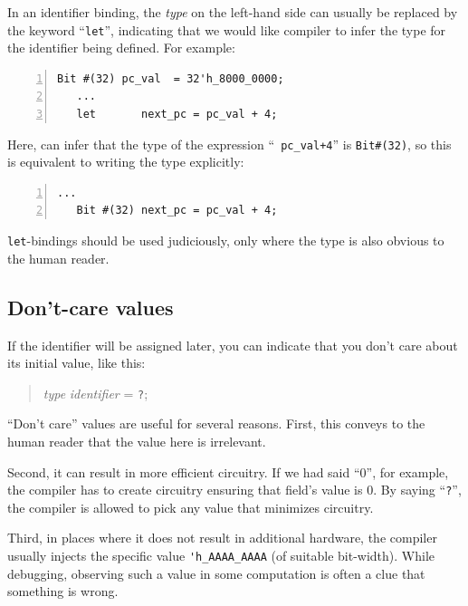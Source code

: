 In an identifier binding, the \emph{type} on the left-hand side can
usually be replaced by the keyword ``{\tt let}'', indicating that we
would like {\bsc} compiler to infer the type for the identifier being
defined.  For example:

{\footnotesize
\begin{Verbatim}[frame=single, numbers=left]
   Bit #(32) pc_val  = 32'h_8000_0000;
   ...
   let       next_pc = pc_val + 4;
\end{Verbatim}
}

Here, {\bsc} can infer that the type of the expression ``{\tt
pc\_val+4}'' is \verb|Bit#(32)|, so this is equivalent to writing the
type explicitly:

{\footnotesize
\begin{Verbatim}[frame=single, numbers=left]
   ...
   Bit #(32) next_pc = pc_val + 4;
\end{Verbatim}
}

{\tt let}-bindings should be used judiciously, only where the type is
also obvious to the human reader.


\subsection{Don't-care values} 

\label{Sec_Dont_Care_Values}


If the identifier will be assigned later, you can indicate that you
don't care about its initial value, like this:

\begin{quote}
\emph{type} \emph{identifier} = {\tt ?};
\end{quote}

``Don't care'' values are useful for several reasons.  First, this
conveys to the human reader that the value here is irrelevant.

Second, it can result in more efficient circuitry.  If we had said
``0'', for example, the {\bsc} compiler has to create circuitry
ensuring that field's value is 0. By saying ``\verb|?|'', the
{\bsc} compiler is allowed to pick any value that minimizes
circuitry.

Third, in places where it does not result in additional hardware, the
{\bsc} compiler usually injects the specific value
\verb|'h_AAAA_AAAA| (of suitable bit-width).  While debugging,
observing such a value in some computation is often a clue that
something is wrong.

